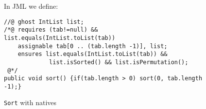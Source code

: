 \begin{figure}[t!]
{\small In JML we define:
\begin{verbatim}
//@ ghost IntList list;
/*@ requires (tab!=null) && list.equals(IntList.toList(tab))
    assignable tab[0 .. (tab.length -1)], list;
    ensures list.equals(IntList.toList(tab)) &&
             list.isSorted() && list.isPermutation();
 @*/
public void sort() {if(tab.length > 0) sort(0, tab.length -1);}\end{verbatim}}
\caption{\texttt{Sort} with natives}\label{sortnat} 
\end{figure}




